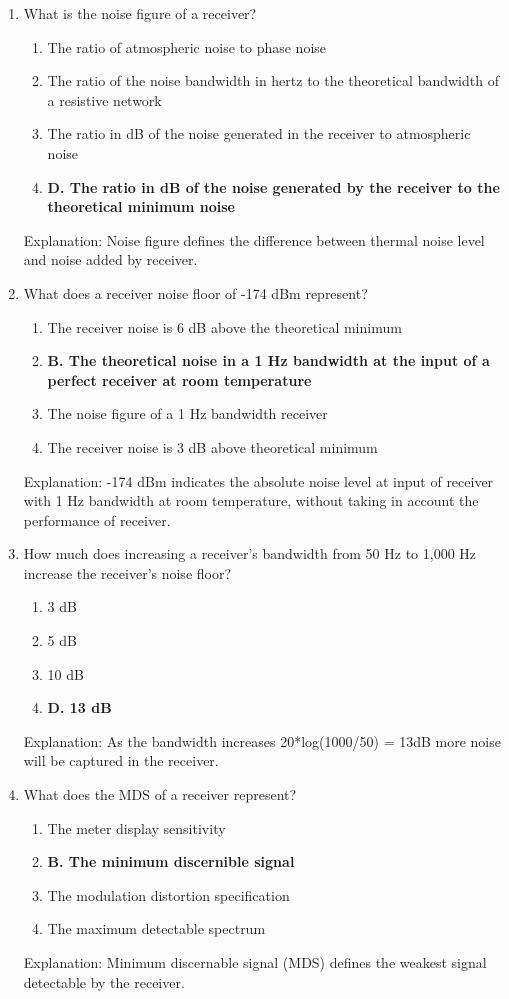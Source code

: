 \begin{enumerate}
        \item What is the noise figure of a receiver?
      \begin{enumerate}
     \item  The ratio of atmospheric noise to phase noise
    \item  The ratio of the noise bandwidth in hertz to the theoretical bandwidth of a resistive network
       \item  The ratio in dB of the noise generated in the receiver to atmospheric noise
      \item \textbf{D. The ratio in dB of the noise generated by the receiver to the theoretical minimum noise}
     \end{enumerate}
      \textcolor{myred}{Explanation:}
        Noise figure defines the difference between thermal noise level and noise added by receiver.

    \item What does a receiver noise floor of -174 dBm represent?
        \begin{enumerate}
       \item  The receiver noise is 6 dB above the theoretical minimum
   \item \textbf{B. The theoretical noise in a 1 Hz bandwidth at the input of a perfect receiver at room temperature}
   \item  The noise figure of a 1 Hz bandwidth receiver
        \item  The receiver noise is 3 dB above theoretical minimum
    \end{enumerate}
   \textcolor{myred}{Explanation:}
     -174 dBm indicates the absolute noise level at input of receiver with 1 Hz bandwidth at room temperature, without taking in account the performance of receiver.

    \item How much does increasing a receiver's bandwidth from 50 Hz to 1,000 Hz increase the receiver's noise floor?
    \begin{enumerate}
      \item  3 dB
        \item  5 dB
         \item  10 dB
       \item \textbf{D. 13 dB}
    \end{enumerate}
        \textcolor{myred}{Explanation:}
       As the bandwidth increases 20*log(1000/50) = 13dB more noise will be captured in the receiver.
     
   \item What does the MDS of a receiver represent?
        \begin{enumerate}
        \item  The meter display sensitivity
       \item \textbf{B. The minimum discernible signal}
        \item  The modulation distortion specification
       \item  The maximum detectable spectrum
       \end{enumerate}
       \textcolor{myred}{Explanation:}
          Minimum discernable signal (MDS) defines the weakest signal detectable by the receiver.
          

\end{enumerate}
